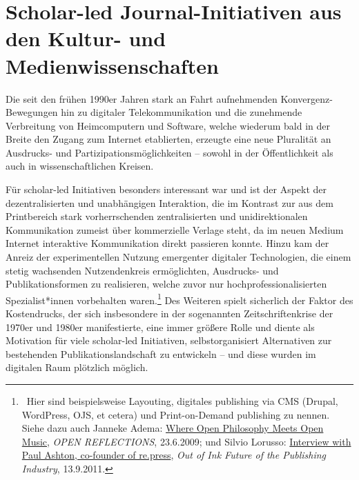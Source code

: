 \documentclass[a4paper,
fontsize=11pt,
oneside,
numbers=noperiodatend,
parskip=half-,
bibliography=totoc,
final
]{scrartcl}
\begin{document}
\hypertarget{scholar-led-journal-initiativen-aus-den-kultur--und-medienwissenschaften}{%
\section{Scholar-led Journal-Initiativen aus den Kultur- und
Medienwissenschaften}\label{scholar-led-journal-initiativen-aus-den-kultur--und-medienwissenschaften}}

Die seit den frühen 1990er Jahren stark an Fahrt aufnehmenden
Konvergenz-Bewegungen hin zu digitaler Telekommunikation und die
zunehmende Verbreitung von Heimcomputern und Software, welche wiederum
bald in der Breite den Zugang zum Internet etablierten, erzeugte eine
neue Pluralität an Ausdrucks- und Partizipationsmöglichkeiten -- sowohl
in der Öffentlichkeit als auch in wissenschaftlichen Kreisen.

Für scholar-led Initiativen besonders interessant war und ist der Aspekt
der dezentralisierten und unabhängigen Interaktion, die im Kontrast zur
aus dem Printbereich stark vorherrschenden zentralisierten und
unidirektionalen Kommunikation zumeist über kommerzielle Verlage steht,
da im neuen Medium Internet interaktive Kommunikation direkt passieren
konnte. Hinzu kam der Anreiz der experimentellen Nutzung emergenter
digitaler Technologien, die einem stetig wachsenden Nutzendenkreis
ermöglichten, Ausdrucks- und Publikationsformen zu realisieren, welche
zuvor nur hochprofessionalisierten Spezialist*innen vorbehalten
waren.\footnote{~Hier sind beispielsweise Layouting, digitales
  publishing via CMS (Drupal, WordPress, OJS, et cetera) und
  Print-on-Demand publishing zu nennen. Siehe dazu auch Janneke Adema:
  \href{https://openreflections.wordpress.com/2009/06/23/where-open-philosophy-meets-open-music/}{Where
  Open Philosophy Meets Open Music}, \emph{OPEN REFLECTIONS}, 23.6.2009;
  und Silvio Lorusso:
  \href{https://networkcultures.org/outofink/2011/09/13/interview-with-paul-ashton-co-founder-of-re-press/}{Interview
  with Paul Ashton, co-founder of re.press}, \emph{Out of Ink \textbar{}
  Future of the Publishing Industry}, 13.9.2011.} Des Weiteren spielt
sicherlich der Faktor des Kostendrucks, der sich insbesondere in der
sogenannten Zeitschriftenkrise der 1970er und 1980er manifestierte, eine
immer größere Rolle und diente als Motivation für viele scholar-led
Initiativen, selbstorganisiert Alternativen zur bestehenden
Publikationslandschaft zu entwickeln -- und diese wurden im digitalen
Raum plötzlich möglich.
\end{document}
